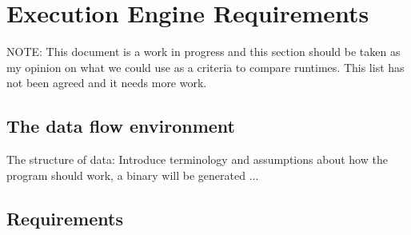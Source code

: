 \section{Execution Engine Requirements}

NOTE: This document is a work in progress and this section should be taken as my opinion on what we could use as a criteria to compare runtimes.
This list has not been agreed and it needs more work.

\subsection{The data flow environment}

The structure of data: Introduce terminology and assumptions about how the program should work, a binary will be generated ...

\subsection{Requirements}

